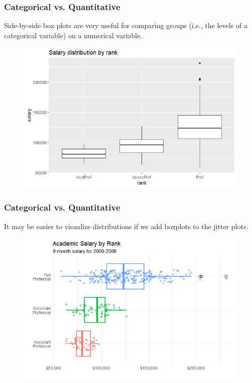 \documentclass{beamer}
\begin{document}

\begin{frame}[fragile] %
\frametitle{Categorical vs. Quantitative}

\begin{example} 
Side-by-side box plots are very useful for comparing groups (i.e., the levels of a categorical variable) on a numerical variable.

\end{example}
\begin{figure}
\includegraphics[width=0.75\linewidth]{Seminar_3_images/R/11.png}
\end{figure}
\end{frame}


\begin{frame}[fragile] %
\frametitle{Categorical vs. Quantitative}

\begin{example} 

It may be easier to visualize distributions if we add boxplots to the jitter plots.

\end{example}
\begin{figure}
\includegraphics[width=0.75\linewidth]{Seminar_3_images/R/12.png}
\end{figure}
\end{frame}
\end{document}
